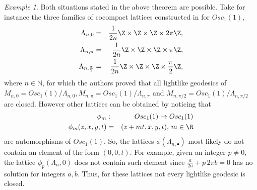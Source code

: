 \documentclass[12pt]{amsart}
\theoremstyle{plain}
\theoremstyle{definition}
\theoremstyle{remark}
\newtheorem{exa}[thm]{Example}
\begin{document}
		
		
		\begin{exa}\label{Lattice4} Both situations stated in the above theorem are possible. Take for instance the three families of cocompact lattices constructed in \cite{BOV} for  $Osc_1(1)$,
			\begin{eqnarray*} \label{geodlight}
				\Lambda_{n,0}&=&\frac{1}{2n}\Z \times \Z \times \Z \times 2 \pi \Z,\\
				\Lambda_{n,\pi}&=&\frac{1}{2n}\Z \times \Z \times \Z \times \pi \Z,\\
				\Lambda_{n,\frac{\pi}{2}}&=&\frac{1}{2n}\Z \times \Z \times \Z \times \frac{\pi}{2} \Z,
			\end{eqnarray*}
			where $n \in \mathbb{N}$, for which the authors proved that all lightlike geodesics of $M_{n,0}=Osc_1(1)/\Lambda_{n,0}, M_{n,\pi}=Osc_1(1)/\Lambda_{n,\pi}$ and $M_{n,\pi/2}=Osc_1(1)/\Lambda_{n,\pi/2}$ are closed. However other  lattices can be obtained by noticing that
			\begin{eqnarray*}
				\phi_m &:& Osc_1(1) \rightarrow Osc_1(1)\\
				\phi_m(z,x,y,t)&=&(z+mt,x,y,t) \textrm{,    $m \in \R$}
			\end{eqnarray*}
			are  automorphisms of $Osc_1(1)$. So, the  lattices $\phi(\Lambda_{n,\bullet})$ most likely do not contain an element of the form $(0,0, t)$. For example, given an integer $p \neq 0$, the lattice $\phi_p(\Lambda_n,0)$ does not contain such element since $\frac{a}{2 n}+ p \, 2 \pi b = 0$ has no solution for integers $a,b$. Thus, for these lattices not every lightlike geodesic is closed. \\
			
		\end{exa}
  
\end{document}
